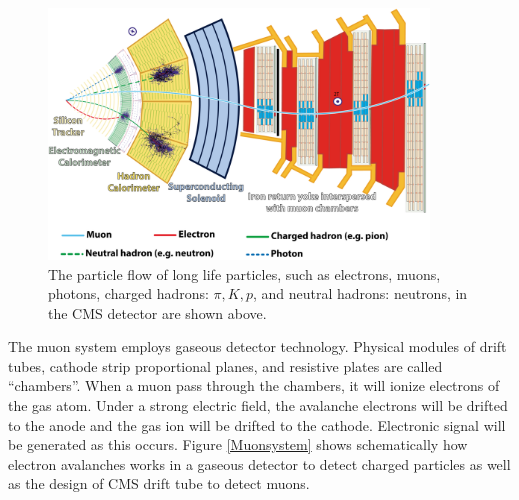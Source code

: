\begin{figure}[hbtp]
\begin{center}
\includegraphics[width=0.90\textwidth]{Figures/Chapter2/CMSParticleFlow.png}
\caption{The particle flow of long life particles, such as electrons, muons, photons, charged hadrons: $\pi,K,p$, and neutral hadrons: neutrons, in the CMS detector are shown above.}
\label{ParticleFlow}
\end{center}
\end{figure} 


The muon system employs gaseous detector technology. Physical modules of drift tubes, cathode strip proportional planes, and resistive plates are called ``chambers''. When a muon pass through the chambers, it will ionize electrons of the gas atom. Under a strong electric field, the avalanche electrons will be drifted to the anode and the gas ion will be drifted to the cathode. Electronic signal will be generated as this occurs. Figure \ref{Muonsystem} shows schematically how electron avalanches works in a gaseous detector to detect charged particles as well as the design of CMS drift tube to detect muons.


